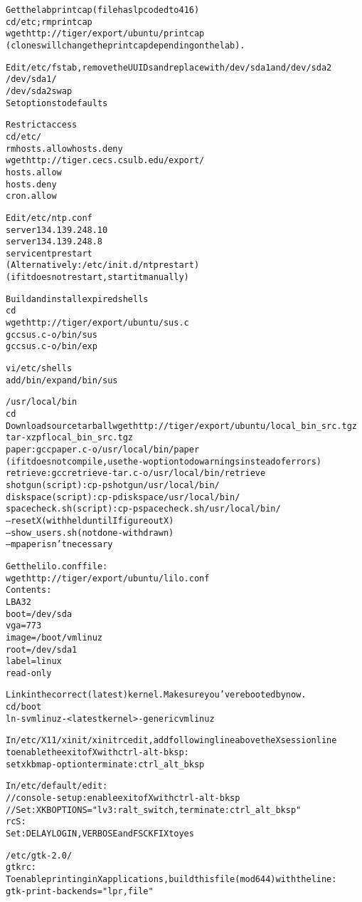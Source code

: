 \begin{alltt}
Get the lab printcap (file has lp coded to 416)
 cd /etc; rm printcap
 wget http://tiger/export/ubuntu/printcap
(clones will change the printcap depending on the lab).

Edit /etc/fstab, remove the UUIDs and replace with /dev/sda1 and /dev/sda2
 /dev/sda1 /
 /dev/sda2 swap
Set options to defaults

Restrict access
 cd /etc/
 rm hosts.allow hosts.deny
 wget http://tiger.cecs.csulb.edu/export/
  hosts.allow
  hosts.deny
  cron.allow

Edit /etc/ntp.conf
  server 134.139.248.10
  server 134.139.248.8
service ntp restart
 (Alternatively: /etc/init.d/ntp restart)
 (if it does not restart, start it manually)

Build and install expired shells
 cd
 wget http://tiger/export/ubuntu/sus.c
 gcc sus.c -o /bin/sus
 gcc sus.c -o /bin/exp

 vi /etc/shells
  add /bin/exp and /bin/sus

/usr/local/bin
  cd
  Download source tarball wget http://tiger/export/ubuntu/local_bin_src.tgz
  tar -xzpf local_bin_src.tgz
  paper: gcc paper.c -o /usr/local/bin/paper
  (if it does not compile, use the -w option to do warnings instead of errors)
  retrieve: gcc retrieve-tar.c -o /usr/local/bin/retrieve
  shotgun (script): cp -p shotgun /usr/local/bin/ 
  diskspace (script): cp -p diskspace /usr/local/bin/ 
  spacecheck.sh (script): cp -p spacecheck.sh /usr/local/bin/
  --resetX (withheld until I figure out X)
  --show_users.sh (not done-withdrawn)
  --mpaper isn't necessary

Get the lilo.conf file:
  wget http://tiger/export/ubuntu/lilo.conf
Contents:
  LBA32
  boot=/dev/sda
  vga = 773
  image = /boot/vmlinuz
    root = /dev/sda1
    label=linux
    read-only

Link in the correct (latest) kernel. Make sure you've rebooted by now.
 cd /boot
 ln -s vmlinuz-<latest kernel>-generic vmlinuz

In /etc/X11/xinit/xinitrc edit, add following line above the Xsession line
 to enable the exit of X with ctrl-alt-bksp:
  setxkbmap -option terminate:ctrl_alt_bksp

In /etc/default/ edit:
  // console-setup: enable exit of X with ctrl-alt-bksp
  //  Set: XKBOPTIONS="lv3:ralt_switch,terminate:ctrl_alt_bksp"
  rcS:
   Set: DELAYLOGIN, VERBOSE and FSCKFIX to yes

/etc/gtk-2.0/
 gtkrc:
  To enable printing in X applications, build this file (mod 644) with the line:
   gtk-print-backends = "lpr,file"


\end{alltt}

